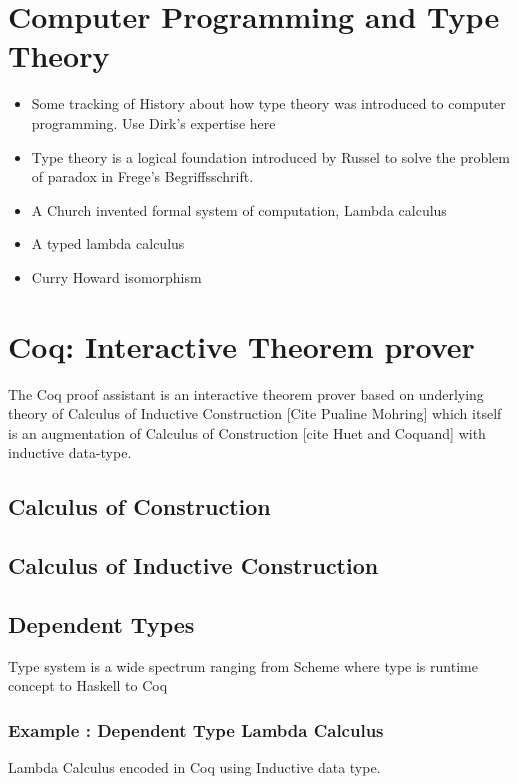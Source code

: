 \section{Computer Programming and Type Theory}
	\begin{itemize}
	\item Some tracking of History about how type theory was introduced 
	     to computer programming. Use Dirk's expertise here
	\item Type theory is a logical foundation introduced by 
	      Russel to solve the problem of  paradox in Frege's 
	      Begriffsschrift.
	\item A Church invented formal system of computation, Lambda calculus
	\item A typed lambda calculus
	\item Curry Howard isomorphism
	\end{itemize}


\section{Coq: Interactive Theorem prover}
\label{sec:problemstatement}
The Coq proof assistant  is an interactive theorem prover based on
underlying theory of Calculus of 
Inductive Construction [Cite Pualine Mohring]  which itself is an 
augmentation of Calculus of Construction 
[cite Huet and Coquand] with inductive data-type.  
 

\subsection{Calculus of Construction}
\subsection{Calculus of Inductive Construction}
 
 

 
\subsection{Dependent Types}
    Type system is a wide spectrum ranging from Scheme where 
    type is runtime concept to Haskell to Coq 
    
    \subsubsection{Example : Dependent Type Lambda Calculus}
     Lambda Calculus encoded in Coq using Inductive data type. 
     
